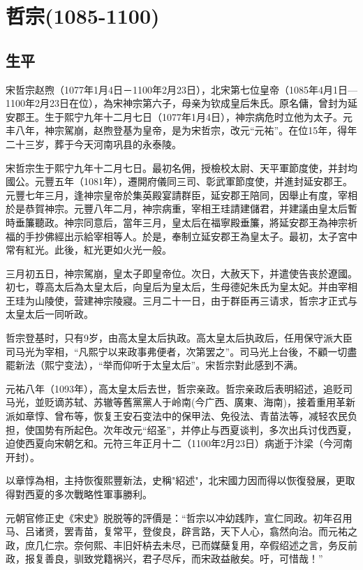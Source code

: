 
\section{哲宗\tiny(1085-1100)}

\subsection{生平}

宋哲宗赵煦（1077年1月4日－1100年2月23日），北宋第七位皇帝（1085年4月1日—1100年2月23日在位），為宋神宗第六子，母亲为钦成皇后朱氏。原名傭，曾封为延安郡王。生于熙宁九年十二月七日（1077年1月4日），神宗病危时立他为太子。元丰八年，神宗駕崩，赵煦登基为皇帝，是为宋哲宗，改元“元祐”。在位15年，得年二十三岁，葬于今天河南巩县的永泰陵。

宋哲宗生于熙宁九年十二月七日。最初名佣，授檢校太尉、天平軍節度使，并封均國公。元豐五年（1081年），遷開府儀同三司、彰武軍節度使，并進封延安郡王。元豐七年三月，逢神宗皇帝於集英殿宴請群臣，延安郡王陪同，因舉止有度，宰相於是恭賀神宗。元豐八年二月，神宗病重，宰相王珪請建儲君，并建議由皇太后暫時垂簾聽政。神宗同意后，當年三月，皇太后在福寧殿垂簾，將延安郡王為神宗祈福的手抄佛經出示給宰相等人。於是，奉制立延安郡王為皇太子。最初，太子宮中常有紅光。此後，紅光更如火光一般。

三月初五日，神宗駕崩，皇太子即皇帝位。次日，大赦天下，并遣使告丧於遼國。初七，尊高太后為太皇太后，向皇后为皇太后，生母德妃朱氏为皇太妃。并由宰相王珪为山陵使，营建神宗陵寢。三月二十一日，由于群臣再三请求，哲宗才正式与太皇太后一同听政。

哲宗登基时，只有9岁，由高太皇太后执政。高太皇太后执政后，任用保守派大臣司马光为宰相，“凡熙宁以来政事弗便者，次第罢之”。司马光上台後，不顧一切盡罷新法（熙宁变法），“举而仰听于太皇太后”。宋哲宗對此感到不满。

元祐八年（1093年），高太皇太后去世，哲宗亲政。哲宗亲政后表明紹述，追贬司马光，並贬谪苏轼、苏辙等舊黨黨人于岭南(今广西、廣東、海南)，接着重用革新派如章惇、曾布等，恢复王安石变法中的保甲法、免役法、青苗法等，减轻农民负担，使国势有所起色。次年改元“绍圣”，并停止与西夏谈判，多次出兵讨伐西夏，迫使西夏向宋朝乞和。元符三年正月十二（1100年2月23日）病逝于汴梁（今河南开封）。

以章惇為相，主持恢復熙豐新法，史稱"紹述"，北宋國力因而得以恢復發展，更取得對西夏的多次戰略性軍事勝利。

元朝官修正史《宋史》脱脱等的評價是：“哲宗以冲幼践阼，宣仁同政。初年召用马、吕诸贤，罢青苗，复常平，登俊良，辟言路，天下人心，翕然向治。而元祐之政，庶几仁宗。奈何熙、丰旧奸枿去未尽，已而媒蘖复用，卒假绍述之言，务反前政，报复善良，驯致党籍祸兴，君子尽斥，而宋政益敝矣。吁，可惜哉！”


